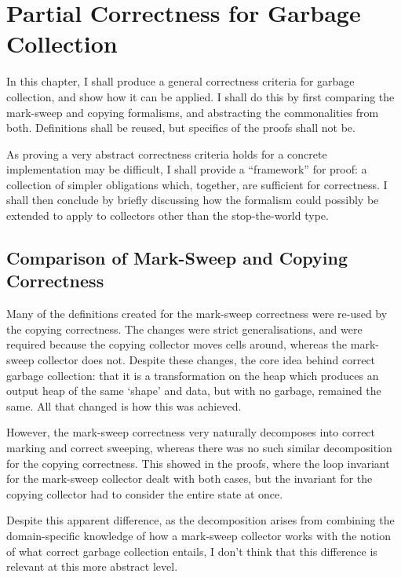 \chapter{Partial Correctness for Garbage Collection}
\label{sec:gc}

In this chapter, I shall produce a general correctness criteria for
garbage collection, and show how it can be applied. I shall do this by
first comparing the mark-sweep and copying formalisms, and abstracting
the commonalities from both. Definitions shall be reused, but
specifics of the proofs shall not be.

As proving a very abstract correctness criteria holds for a concrete
implementation may be difficult, I shall provide a ``framework'' for
proof: a collection of simpler obligations which, together, are
sufficient for correctness. I shall then conclude by briefly
discussing how the formalism could possibly be extended to apply to
collectors other than the stop-the-world type.

\section{Comparison of Mark-Sweep and Copying Correctness}
\label{sec:gc-comparison}

Many of the definitions created for the mark-sweep correctness were
re-used by the copying correctness. The changes were strict
generalisations, and were required because the copying collector moves
cells around, whereas the mark-sweep collector does not. Despite these
changes, the core idea behind correct garbage collection: that it is
a transformation on the heap which produces an output heap of the same
`shape' and data, but with no garbage, remained the same. All that
changed is how this was achieved.

However, the mark-sweep correctness very naturally decomposes into
correct marking and correct sweeping, whereas there was no such
similar decomposition for the copying correctness. This showed in the
proofs, where the loop invariant for the mark-sweep collector dealt
with both cases, but the invariant for the copying collector had to
consider the entire state at once.

Despite this apparent difference, as the decomposition arises from
combining the domain-specific knowledge of how a mark-sweep collector
works with the notion of what correct garbage collection entails, I
don't think that this difference is relevant at this more abstract
level.


